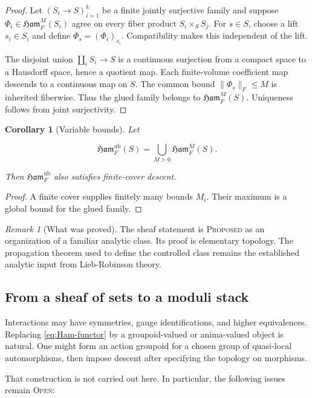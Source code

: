 \documentclass[12pt]{article}
\newtheorem{corollary}[theorem]{Corollary}
\theoremstyle{definition}
\theoremstyle{remark}
\newtheorem{remark}[theorem]{Remark}
\newcommand{\Ham}{\mathfrak{Ham}}
\newcommand{\PROP}{\textsc{Proposed}}
\newcommand{\OPEN}{\textsc{Open}}
\begin{document}
\begin{proof}
Let $(S_i\to S)_{i=1}^k$ be a finite jointly surjective family and suppose
$\Phi_i\in\Ham_F^M(S_i)$ agree on every fiber product
$S_i\times_S S_j$.  For $s\in S$, choose a lift $s_i\in S_i$ and define
$\Phi_s=(\Phi_i)_{s_i}$.  Compatibility makes this independent of the lift.

The disjoint union $\coprod_i S_i\to S$ is a continuous surjection from a
compact space to a Hausdorff space, hence a quotient map.  Each finite-volume
coefficient map descends to a continuous map on $S$.  The common bound
$\|\Phi_s\|_F\le M$ is inherited fiberwise.  Thus the glued family belongs to
$\Ham_F^M(S)$.  Uniqueness follows from joint surjectivity.
\end{proof}

\begin{corollary}[Variable bounds]
Let

\begin{equation}
  \Ham_F^{\mathrm{ub}}(S)=\bigcup_{M>0}\Ham_F^M(S).
\end{equation}

Then $\Ham_F^{\mathrm{ub}}$ also satisfies finite-cover descent.
\end{corollary}

\begin{proof}
A finite cover supplies finitely many bounds $M_i$.  Their maximum is a global
bound for the glued family.
\end{proof}

\begin{remark}[What was proved]
The sheaf statement is \PROP{} as an organization of a familiar analytic
class.  Its proof is elementary topology.  The propagation theorem used to
define the controlled class remains the established analytic input from
Lieb-Robinson theory.
\end{remark}

\subsection{From a sheaf of sets to a moduli stack}

Interactions may have symmetries, gauge identifications, and higher
equivalences.  Replacing \cref{eq:Ham-functor} by a groupoid-valued or
anima-valued object is natural.  One might form an action groupoid for a
chosen group of quasi-local automorphisms, then impose descent after specifying
the topology on morphisms.

That construction is not carried out here.  In particular, the following
issues remain \OPEN{}:
\end{document}
